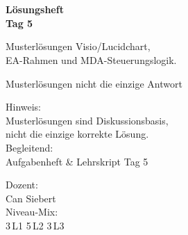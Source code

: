 \documentclass[11pt,a4paper,oneside]{article}
\begin{document}
\begin{titlepage}
  \pagestyle{empty}
  \vspace*{1.5cm}
  \\[2pt]
  \noindent{\color{lpAccent}\rule{\linewidth}{1.2pt}}\\[4pt]

  \vspace{3cm}
  {\sffamily\fontsize{30}{34}\selectfont\bfseries\color{lpInk}L\"osungsheft\\Tag 5\par}

  \vspace{0.7cm}
  {\sffamily\large\color{lpGray}Musterl\"osungen \textendash{} Visio/Lucidchart,\\EA-Rahmen und MDA-Steuerungslogik.\par}

  \vspace{1.5cm}
  {\caveatfont\LARGE\color{lpGreen}Musterl\"osungen \textperiodcentered{} nicht die einzige Antwort}\par

  \vfill

  \noindent\begin{minipage}{0.55\linewidth}
    {\sffamily\footnotesize\color{lpGray}Hinweis:}\\
    {\sffamily\small\color{lpInk}Musterl\"osungen sind Diskussionsbasis,\\nicht die einzige korrekte L\"osung.}\\[10pt]
    {\sffamily\footnotesize\color{lpGray}Begleitend:}\\
    {\sffamily\small\color{lpInk}Aufgabenheft \& Lehrskript Tag 5}
  \end{minipage}\hfill
  \begin{minipage}{0.4\linewidth}
    \raggedleft
    {\sffamily\footnotesize\color{lpGray}Dozent:}\\
    {\sffamily\small\color{lpInk}Can Siebert}\\[10pt]
    {\sffamily\footnotesize\color{lpGray}Niveau-Mix:}\\
    {\sffamily\small\color{lpInk}3\,L1 \textperiodcentered{} 5\,L2 \textperiodcentered{} 3\,L3}
  \end{minipage}

  \vspace{0.5cm}
  \noindent{\color{lpAccent}\rule{\linewidth}{0.6pt}}
\end{titlepage}
\end{document}
